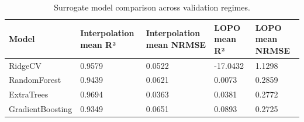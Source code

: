 \begin{table}[t]
\centering
\caption{Surrogate model comparison across validation regimes.}
\label{tab:model_comparison}
\begin{tabular}{lllll}
\hline
Model & Interpolation mean R² & Interpolation mean NRMSE & LOPO mean R² & LOPO mean NRMSE \\
\hline
RidgeCV & 0.9579 & 0.0522 & -17.0432 & 1.1298 \\
RandomForest & 0.9439 & 0.0621 & 0.0073 & 0.2859 \\
ExtraTrees & 0.9694 & 0.0363 & 0.0381 & 0.2772 \\
GradientBoosting & 0.9349 & 0.0651 & 0.0893 & 0.2725 \\
\hline
\end{tabular}
\end{table}

